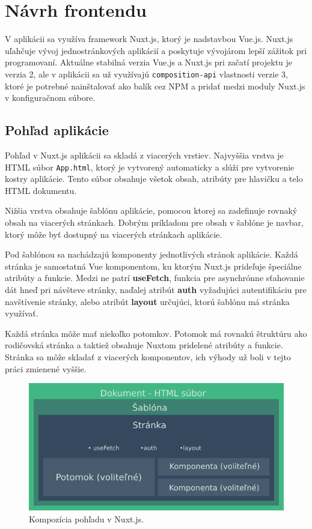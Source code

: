 \section{Návrh frontendu}
V aplikácii sa využíva framework Nuxt.js, ktorý je nadstavbou Vue.js. Nuxt.js uľahčuje vývoj jednostránkových aplikácií a poskytuje vývojárom lepší zážitok pri programovaní. 
Aktuálne stabilná verzia Vue.js a Nuxt.js pri začatí projektu je verzia 2, ale v aplikácii sa už využívajú \texttt{composition-api} vlastnosti verzie 3, ktoré je potrebné nainštalovať ako balík cez NPM a pridať medzi moduly Nuxt.js v konfiguračnom súbore.

\subsection{Pohľad aplikácie}
Pohľad v Nuxt.js aplikácii sa skladá z viacerých vrstiev. Najvyššia vrstva je HTML súbor \texttt{App.html}, ktorý je vytvorený automaticky a slúži pre vytvorenie kostry aplikácie. Tento súbor obsahuje všetok obsah, atribúty pre hlavičku a telo HTML dokumentu. 

Nižšia vrstva obsahuje šablónu aplikácie, pomocou ktorej sa zadefinuje rovnaký obsah na viacerých stránkach. Dobrým príkladom pre obsah v šablóne je navbar, ktorý môže byť dostupný na viacerých stránkach aplikácie. 

Pod šablónou sa nachádzajú komponenty jednotlivých stránok aplikácie. Každá stránka je samostatná Vue komponentom, ku ktorým Nuxt.js prideľuje špeciálne atribúty a funkcie. Medzi ne patrí \textbf{useFetch}, funkcia pre asynchrónne sťahovanie dát hneď pri návšteve stránky, naďalej atribút \textbf{auth} vyžadujúci autentifikáciu pre navštívenie stránky, alebo atribút \textbf{layout} určujúci, ktorú šablónu má stránka využívať.

Každá stránka môže mať niekoľko potomkov. Potomok má rovnakú štruktúru ako rodičovská stránka a taktiež obsahuje Nuxtom pridelené atribúty a funkcie. Stránka sa môže skladať z viacerých komponentov, ich výhody už boli v tejto práci zmienené vyššie.

    \begin{figure}[!hbt]
        \centering
        \includegraphics[scale=0.4]{obrazky/nuxt_struktura.png}
        \caption{Kompozícia pohľadu v Nuxt.js.}
        \label{pic:nuxt_strukture}
    \end{figure}


